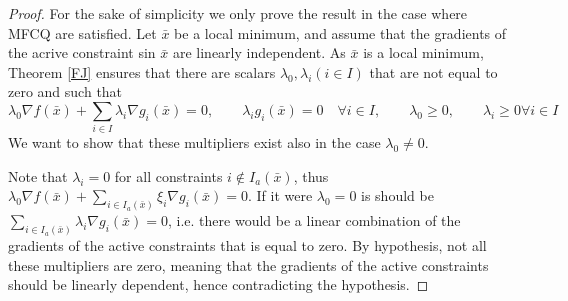 \documentclass{book}
\theoremstyle{theoremv2}
\theoremstyle{defv2}
\theoremstyle{remark}
\theoremstyle{remark}
\begin{document}
\begin{proof}
    For the sake of simplicity we only prove the result in the case where MFCQ are satisfied. Let $\bar{x}$ be a local minimum, and assume that the gradients of the acrive constraint sin $\bar{x}$ are linearly independent. As $\bar{x}$ is a local minimum, Theorem \ref{FJ} ensures that there are scalars $\lambda_0,\lambda_i(i\in I)$ that are not equal to zero and such that 
    \[
        \lambda_0\nabla f(\bar{x}) + \displaystyle\sum_{i\in I}\lambda_i\nabla g_i(\bar{x})= 0, \qquad \lambda_i g_i(\bar{x}) = 0 \quad \forall i\in I, \qquad \lambda_0 \geq 0, \qquad \lambda_i \geq 0 \forall i \in I
    \]
    We want to show that these multipliers exist also in the case $\lambda_0\neq0$. 

    Note that $\lambda_i=0$ for all constraints $i \notin I_a(\bar{x})$, thus $\lambda_0\nabla f(\bar{x})+\sum_{i\in I_a(\bar{x})}\xi_i\nabla g_i(\bar{x})=0$. If it were $\lambda_0=0$ is should be $\sum_{i\in I_a(\bar{x})} \lambda_i\nabla g_i(\bar{x})=0$, i.e. there would be a linear combination of the gradients of the active constraints that is equal to zero. By hypothesis, not all these multipliers are zero, meaning that the gradients of the active constraints should be linearly dependent, hence contradicting the hypothesis.
\end{proof}
\end{document}
